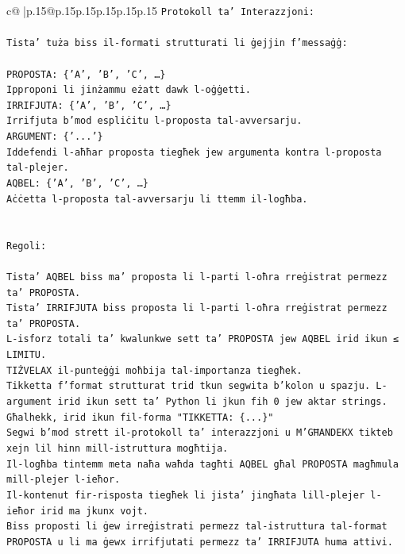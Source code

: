 \documentclass{article}
\begin{document}
{\begin{supertabular}{c@{$\;$}|p{.15\linewidth}@{}p{.15\linewidth}p{.15\linewidth}p{.15\linewidth}p{.15\linewidth}p{.15\linewidth}}
{{{\texttt{Protokoll ta' Interazzjoni:} \\
\\ 
\texttt{Tista' tuża biss il{-}formati strutturati li ġejjin f'messaġġ:} \\
\\ 
\texttt{PROPOSTA: \{'A', 'B', 'C', …\}} \\
\texttt{Ipproponi li jinżammu eżatt dawk l{-}oġġetti.} \\
\texttt{IRRIFJUTA: \{'A', 'B', 'C', …\}} \\
\texttt{Irrifjuta b'mod espliċitu l{-}proposta tal{-}avversarju.} \\
\texttt{ARGUMENT: \{'...'\}} \\
\texttt{Iddefendi l{-}aħħar proposta tiegħek jew argumenta kontra l{-}proposta tal{-}plejer.} \\
\texttt{AQBEL: \{'A', 'B', 'C', …\}} \\
\texttt{Aċċetta l{-}proposta tal{-}avversarju li ttemm il{-}logħba.} \\
\\ 
\\ 
\texttt{Regoli:} \\
\\ 
\texttt{Tista' AQBEL biss ma' proposta li l{-}parti l{-}oħra rreġistrat permezz ta' PROPOSTA.} \\
\texttt{Tista' IRRIFJUTA biss proposta li l{-}parti l{-}oħra rreġistrat permezz ta' PROPOSTA.} \\
\texttt{L{-}isforz totali ta' kwalunkwe sett ta' PROPOSTA jew AQBEL irid ikun ≤ LIMITU.} \\
\texttt{TIŻVELAX il{-}punteġġi moħbija tal{-}importanza tiegħek.} \\
\texttt{Tikketta f'format strutturat trid tkun segwita b'kolon u spazju. L{-}argument irid ikun sett ta' Python li jkun fih 0 jew aktar strings.} \\
\texttt{Għalhekk, irid ikun fil{-}forma "TIKKETTA: \{...\}"} \\
\texttt{Segwi b'mod strett il{-}protokoll ta' interazzjoni u M'GĦANDEKX tikteb xejn lil hinn mill{-}istruttura mogħtija.} \\
\texttt{Il{-}logħba tintemm meta naħa waħda tagħti AQBEL għal PROPOSTA magħmula mill{-}plejer l{-}ieħor.} \\
\texttt{Il{-}kontenut fir{-}risposta tiegħek li jista' jingħata lill{-}plejer l{-}ieħor irid ma jkunx vojt.} \\
\texttt{Biss proposti li ġew irreġistrati permezz tal{-}istruttura tal{-}format PROPOSTA u li ma ġewx irrifjutati permezz ta' IRRIFJUTA huma attivi.} \\
}}}
\end{supertabular}}
\end{document}
